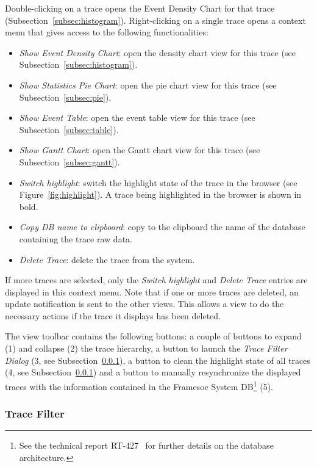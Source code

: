 \documentclass[twoside]{article}
\begin{document}
\begin{sloppypar}
Double-clicking on a trace opens the Event Density Chart for that trace (Subsection~\ref{subsec:histogram}).
Right-clicking on a single trace opens a context menu that gives access to the following functionalities:
\begin{itemize}
 \item \emph{Show Event Density Chart}: open the density chart view for this trace (see Subsection~\ref{subsec:histogram}).
 \item \emph{Show Statistics Pie Chart}: open the pie chart view for this trace (see Subsection~\ref{subsec:pie}).
 \item \emph{Show Event Table}: open the event table view for this trace (see Subsection~\ref{subsec:table}).
 \item \emph{Show Gantt Chart}: open the Gantt chart view for this trace (see Subsection~\ref{subsec:gantt}).
 \item \emph{Switch highlight}: switch the highlight state of the trace in the browser (see Figure~\ref{fig:highlight}). A trace being highlighted in the browser is shown in bold.
 \item \emph{Copy DB name to clipboard}: copy to the clipboard the name of the database containing the trace raw data.
 \item \emph{Delete Trace}: delete the trace from the system.
\end{itemize}
If more traces are selected, only the \emph{Switch highlight} and \emph{Delete Trace} entries are displayed in this context menu.
Note that if one or more traces are deleted, an update notification is sent to the other views.
This allows a view to do the necessary actions if the trace it displays has been deleted.

The view toolbar contains the following buttons: a couple of buttons to expand (\num{1}) and collapse (\num{2}) the trace hierarchy, a button to launch the \emph{Trace Filter Dialog} (\num{3}, see Subsection~\ref{subsubsec:trace_filter}), a button to clean the highlight state of all traces (\num{4}, see Subsection~\ref{subsubsec:trace_filter}) and a button to manually resynchronize the displayed traces with the information contained in the Framesoc System DB\footnote{See the technical report RT-427~\cite{pagano:hal} for further details on the database architecture.} (\num{5}).

\subsubsection{Trace Filter}
\label{subsubsec:trace_filter}


\end{sloppypar}
\end{document}
